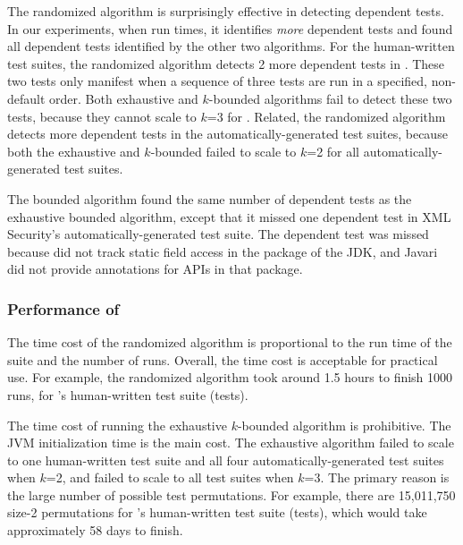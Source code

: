 The randomized algorithm is surprisingly effective in
detecting dependent tests. In our experiments, when run \trialnum times,
it identifies \textit{more} dependent tests and found all
dependent tests identified by the other two algorithms.
For the human-written
test suites, the randomized algorithm detects 2 more dependent
tests in \jt. These two tests only
manifest when a sequence of three tests are run in a specified,
non-default order. Both exhaustive and \dependenceaware{} $k$-bounded
algorithms fail to detect these two tests, because
they cannot scale to $k$=3 for 
\jt. Related, the randomized algorithm
detects more dependent
tests in the automatically-generated test suites,
because both the exhaustive and \dependenceaware{} $k$-bounded
failed to scale to $k$=2 for all automatically-generated test suites.

The \dependenceaware{} bounded algorithm found the same
number of dependent tests as the exhaustive bounded algorithm, except
that it missed one dependent test in XML Security's
automatically-generated test suite.
The dependent test was missed because \ourtool
did not track static field access in the  package
of the JDK, and Javari did not provide annotations for APIs
in that package.


\subsubsection{Performance of \ourtool}
\label{sec:performance}

The time cost of the randomized algorithm 
is proportional to the run time of the suite and the number of runs.
Overall, the time cost is acceptable for practical use.
For example, the randomized algorithm took around 1.5 hours
to finish 1000 runs,  for \jt's human-written test
suite (\jodatimetests tests).
 
The time cost of running the exhaustive $k$-bounded algorithm
is prohibitive. The JVM initialization time is the main cost.
The exhaustive algorithm failed to
scale to one human-written test suite and all four automatically-generated
test suites when $k$=2, and failed to scale to all test suites
when $k$=3. The primary reason is the large
number of possible test permutations. 
For example, there are 15,011,750 size-2 permutations
for \jt's human-written test suite (\jodatimetests tests),
which would take approximately 58 days to finish.

